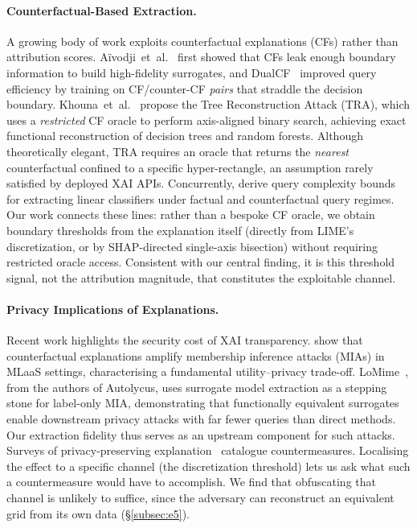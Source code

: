 \documentclass[sigconf,anonymous,review]{acmart}
\begin{document}
\paragraph{Counterfactual-Based Extraction.}
A growing body of work exploits counterfactual explanations (CFs) rather than
attribution scores.
A\"ivodji~et~al.~\cite{aivodji2020model} first showed that CFs leak enough
boundary information to build high-fidelity surrogates, and DualCF~\cite{wang2022dualcf}
improved query efficiency by training on CF/counter-CF \emph{pairs} that
straddle the decision boundary.
Khouna~et~al.~\cite{khouna2025tra} propose the Tree Reconstruction Attack (TRA),
which uses a \emph{restricted} CF oracle to perform axis-aligned binary search,
achieving exact functional reconstruction of decision trees and random forests.
Although theoretically elegant, TRA requires an oracle that returns the
\emph{nearest} counterfactual confined to a specific hyper-rectangle, an assumption rarely satisfied by deployed XAI APIs.
Concurrently, \citet{otto2026linear} derive query complexity bounds for extracting
linear classifiers under factual and counterfactual query regimes.
Our work connects these lines: rather than a bespoke CF oracle, we obtain boundary
thresholds from the explanation itself (directly from LIME's discretization, or by SHAP-directed single-axis bisection) without requiring restricted oracle access.
Consistent with our central finding, it is this threshold signal, not the attribution
magnitude, that constitutes the exploitable channel.

\paragraph{Privacy Implications of Explanations.}
Recent work highlights the security cost of XAI transparency.
\citet{ezzeddine2026membership} show that counterfactual explanations amplify
membership inference attacks (MIAs) in MLaaS settings, characterising a
fundamental utility--privacy trade-off.
LoMime~\cite{oksuz2026lomime}, from the authors of Autolycus, uses surrogate model
extraction as a stepping stone for label-only MIA, demonstrating that functionally
equivalent surrogates enable downstream privacy attacks with far fewer queries than direct methods. Our extraction fidelity thus serves as an upstream component for such
attacks.
Surveys of privacy-preserving explanation~\cite{nguyen2024survey} catalogue
countermeasures. Localising the effect to a specific channel (the discretization
threshold) lets us ask what such a countermeasure would have to accomplish. We find that obfuscating that channel is unlikely to suffice, since the adversary can
reconstruct an equivalent grid from its own data (\S\ref{subsec:e5}).
\end{document}

